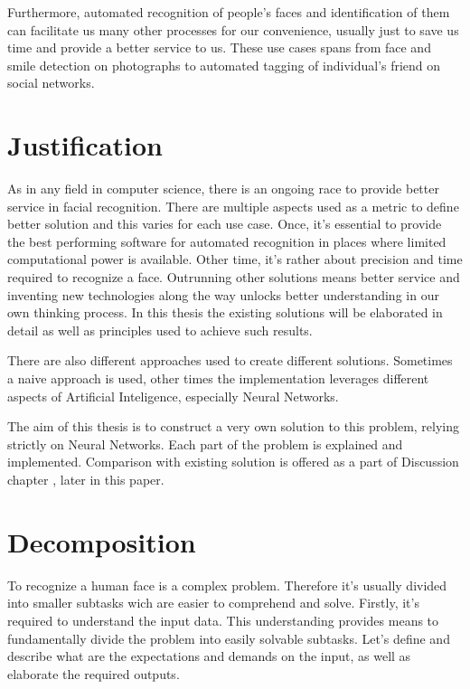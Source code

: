 Furthermore, automated recognition of people's faces and identification of them can facilitate us many other processes for our convenience, usually just to save us time and provide a better service to us. These use cases spans from face and smile detection on photographs to automated tagging of individual's friend on social networks.

\section{Justification}

As in any field in computer science, there is an ongoing race to provide better service in facial recognition. There are multiple aspects used as a metric to define better solution and this varies for each use case. Once, it's essential to provide the best performing software for automated recognition in places where limited computational power is available. Other time, it's rather about precision and time required to recognize a face. Outrunning other solutions means better service and inventing new technologies along the way unlocks better understanding in our own thinking process. In this thesis the existing solutions will be elaborated in detail as well as principles used to achieve such results.

There are also different approaches used to create different solutions. Sometimes a naive approach is used, other times the implementation leverages different aspects of Artificial Inteligence, especially Neural Networks.

The aim of this thesis is to construct a very own solution to this problem, relying strictly on Neural Networks. Each part of the problem is explained and implemented. Comparison with existing solution is offered as a part of Discussion chapter
, later in this paper.


\section{Decomposition}

To recognize a human face is a complex problem. Therefore it's usually divided into smaller subtasks wich are easier to comprehend and solve. Firstly, it's required to understand the input data. This understanding provides means to fundamentally divide the problem into easily solvable subtasks. Let's define and describe what are the expectations and demands on the input, as well as elaborate the required outputs.

